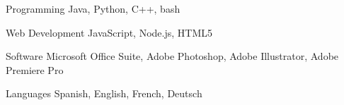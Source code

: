 

\begin{cvskills}

  \cvskill
    {Programming} %
    {Java, Python, C++, bash} %
    
  \cvskill
    {Web Development} %
    {JavaScript, Node.js, HTML5} %
    

  \cvskill
    {Software} %
    {Microsoft Office Suite, Adobe Photoshop, Adobe Illustrator, Adobe Premiere Pro} %

  \cvskill
    {Languages} %
    {Spanish, English, French, Deutsch} %

\end{cvskills}